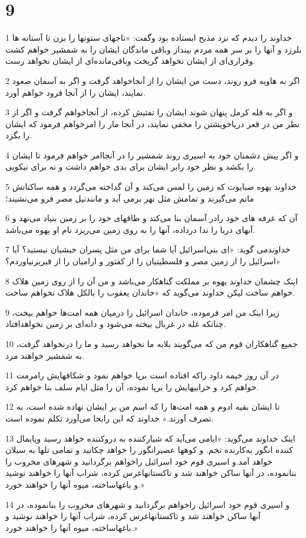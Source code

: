 \chapter{9}

\par 1 خداوند را دیدم که نزد مذبح ایستاده بود وگفت: «تاجهای ستونها را بزن تا آستانه ها بلرزد و آنها را بر سر همه مردم بینداز وباقی ماندگان ایشان را به شمشیر خواهم کشت وفراری‌ای از ایشان نخواهد گریخت وباقی‌مانده‌ای از ایشان نخواهد رست.
\par 2 اگر به هاویه فرو روند، دست من ایشان را از آنجاخواهد گرفت و اگر به آسمان صعود نمایند، ایشان را از آنجا فرود خواهم آورد.
\par 3 و اگر به قله کرمل پنهان شوند ایشان را تفتیش کرده، از آنجاخواهم گرفت و اگر از نظر من در قعر دریاخویشتن را مخفی نمایند، در آنجا مار را امرخواهم فرمود که ایشان را بگزد.
\par 4 و اگر پیش دشمنان خود به اسیری روند شمشیر را در آنجاامر خواهم فرمود تا ایشان را بکشد و نظر خود رابر ایشان برای بدی خواهم داشت و نه برای نیکویی.
\par 5 خداوند یهوه صبایوت که زمین را لمس می‌کند و آن گداخته می‌گردد و همه ساکنانش ماتم می‌گیرند و تمامش مثل نهر برمی آید و مانندنیل مصر فرو می‌نشیند؛
\par 6 آن که غرفه های خود رادر آسمان بنا می‌کند و طاقهای خود را بر زمین بنیاد می‌نهد و آبهای دریا را ندا در‌داده، آنها را به روی زمین می‌ریزد نام او یهوه می‌باشد.
\par 7 خداوندمی گوید: «ای بنی‌اسرائیل آیا شما برای من مثل پسران حبشیان نیستید؟ آیا اسرائیل را از زمین مصر و فلسطینیان را از کفتور و ارامیان را از قیربرنیاوردم؟»
\par 8 اینک چشمان خداوند یهوه بر مملکت گناهکار می‌باشد و من آن را از روی زمین هلاک خواهم ساخت لیکن خداوند می‌گوید که «خاندان یعقوب را بالکل هلاک نخواهم ساخت.
\par 9 زیرا اینک من امر فرموده، خاندان اسرائیل را درمیان همه امت‌ها خواهم بیخت، چنانکه غله در غربال بیخته می‌شود و دانه‌ای بر زمین نخواهدافتاد.
\par 10 جمیع گناهکاران قوم من که می‌گویند بلابه ما نخواهد رسید و ما را درنخواهد گرفت، به شمشیر خواهند مرد.
\par 11 در آن روز خیمه داود راکه افتاده است برپا خواهم نمود و شکافهایش رامرمت خواهم کرد و خرابیهایش را برپا نموده، آن را مثل ایام سلف بنا خواهم کرد.
\par 12 تا ایشان بقیه ادوم و همه امت‌ها را که اسم من بر ایشان نهاده شده است، به تصرف آورند.» خداوند که این رابجا می‌آورد تکلم نموده است.
\par 13 اینک خداوند می‌گوید: «ایامی می‌آید که شیارکننده به دروکننده خواهد رسید وپایمال کننده انگور به‌کارنده تخم. و کوهها عصیرانگور را خواهد چکانید و تمامی تلها به سیلان خواهد آمد.و اسیری قوم خود اسرائیل راخواهم برگردانید و شهرهای مخروب را بنانموده، در آنها ساکن خواهند شد و تاکستانهاغرس کرده، شراب آنها را خواهند نوشید و باغهاساخته، میوه آنها را خواهند خورد.»
\par 14 و اسیری قوم خود اسرائیل راخواهم برگردانید و شهرهای مخروب را بنانموده، در آنها ساکن خواهند شد و تاکستانهاغرس کرده، شراب آنها را خواهند نوشید و باغهاساخته، میوه آنها را خواهند خورد.»



